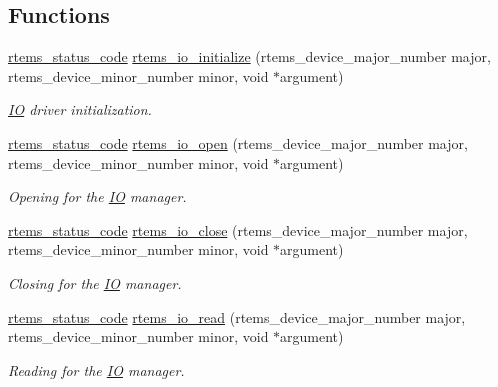 \subsection*{Functions}
\begin{DoxyCompactItemize}
\item 
\mbox{\hyperlink{group__ClassicStatus_ga545d41846817eaba6143d52ee4d9e9fe}{rtems\+\_\+status\+\_\+code}} \mbox{\hyperlink{group__ClassicIO_ga89b9f846123017f1b3729b82d8fccb4f}{rtems\+\_\+io\+\_\+initialize}} (rtems\+\_\+device\+\_\+major\+\_\+number major, rtems\+\_\+device\+\_\+minor\+\_\+number minor, void $\ast$argument)
\begin{DoxyCompactList}\small\item\em \mbox{\hyperlink{structIO}{IO}} driver initialization. \end{DoxyCompactList}\item 
\mbox{\hyperlink{group__ClassicStatus_ga545d41846817eaba6143d52ee4d9e9fe}{rtems\+\_\+status\+\_\+code}} \mbox{\hyperlink{group__ClassicIO_gac205b414c8ab167f99fa9536a4274361}{rtems\+\_\+io\+\_\+open}} (rtems\+\_\+device\+\_\+major\+\_\+number major, rtems\+\_\+device\+\_\+minor\+\_\+number minor, void $\ast$argument)
\begin{DoxyCompactList}\small\item\em Opening for the \mbox{\hyperlink{structIO}{IO}} manager. \end{DoxyCompactList}\item 
\mbox{\hyperlink{group__ClassicStatus_ga545d41846817eaba6143d52ee4d9e9fe}{rtems\+\_\+status\+\_\+code}} \mbox{\hyperlink{group__ClassicIO_ga5c547eb426cce4a71afebb54b3c364d8}{rtems\+\_\+io\+\_\+close}} (rtems\+\_\+device\+\_\+major\+\_\+number major, rtems\+\_\+device\+\_\+minor\+\_\+number minor, void $\ast$argument)
\begin{DoxyCompactList}\small\item\em Closing for the \mbox{\hyperlink{structIO}{IO}} manager. \end{DoxyCompactList}\item 
\mbox{\hyperlink{group__ClassicStatus_ga545d41846817eaba6143d52ee4d9e9fe}{rtems\+\_\+status\+\_\+code}} \mbox{\hyperlink{group__ClassicIO_ga2b18b64e3891228d3815cb1fd527c13b}{rtems\+\_\+io\+\_\+read}} (rtems\+\_\+device\+\_\+major\+\_\+number major, rtems\+\_\+device\+\_\+minor\+\_\+number minor, void $\ast$argument)
\begin{DoxyCompactList}\small\item\em Reading for the \mbox{\hyperlink{structIO}{IO}} manager. \end{DoxyCompactList}\item 

\end{DoxyCompactItemize}
